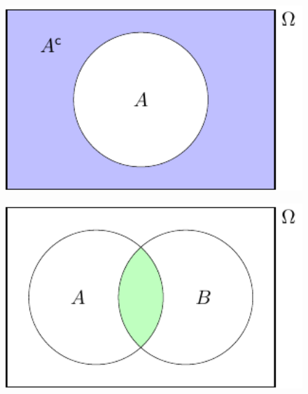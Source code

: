 \documentclass[
  letterpaper,
  DIV=11,
  numbers=noendperiod]{scrreprt}
\theoremstyle{remark}
\begin{document}
~

\begin{figure}

{\centering \includegraphics[width=7.63889in,height=\textheight]{sections/L03-events_files/figure-pdf/venn-not-1.pdf}

}

\end{figure}

\begin{figure}

{\centering \includegraphics[width=7.63889in,height=\textheight]{sections/L03-events_files/figure-pdf/venn-and-1.pdf}

}

\end{figure}
\end{document}
